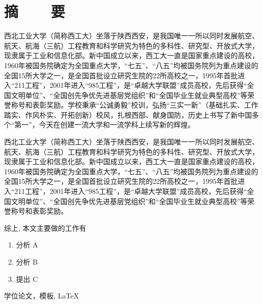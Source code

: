 \renewcommand{\baselinestretch}{1.5}
\fontsize{12pt}{13pt}\selectfont

\chapter[摘要]{摘~~~~要}

西北工业大学（简称西工大）坐落于陕西西安，是我国唯一一所以同时发展航空、航天、航海（三航）工程教育和科学研究为特色的多科性、研究型、开放式大学，现隶属于工业和信息化部。新中国成立以来，西工大一直是国家重点建设的高校，1960年被国务院确定为全国重点大学，“七五”、“八五”均被国务院列为重点建设的全国15所大学之一，是全国首批设立研究生院的22所高校之一，1995年首批进入“211工程”，2001年进入“985工程”，是“卓越大学联盟”成员高校，先后获得“全国文明单位”、“全国创先争优先进基层党组织”和“全国毕业生就业典型高校”等荣誉称号和表彰奖励。学校秉承“公诚勇毅”校训，弘扬“三实一新”（基础扎实、工作踏实、作风朴实、开拓创新）校风，扎根西部、献身国防，历史上书写了新中国多个“第一”，今天在创建一流大学和一流学科上续写新的辉煌。

西北工业大学（简称西工大）坐落于陕西西安，是我国唯一一所以同时发展航空、航天、航海（三航）工程教育和科学研究为特色的多科性、研究型、开放式大学，现隶属于工业和信息化部。新中国成立以来，西工大一直是国家重点建设的高校，1960年被国务院确定为全国重点大学，“七五”、“八五”均被国务院列为重点建设的全国15所大学之一，是全国首批设立研究生院的22所高校之一，1995年首批进入“211工程”，2001年进入“985工程”，是“卓越大学联盟”成员高校，先后获得“全国文明单位”、“全国创先争优先进基层党组织”和“全国毕业生就业典型高校”等荣誉称号和表彰奖励。

综上, 本文主要做的工作有
\vspace{-10pt}
\begin{enumerate}
    \item 分析 A
    \item 分析 B
    \item 提出 C
\end{enumerate}
\vspace{-10pt}

\vspace{1em}
 \quad 学位论文，模板, \LaTeX

\clearpage
\endinput
